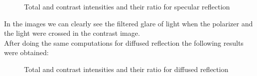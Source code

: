 \documentclass[english]{article}
\begin{document}
\begin{figure}[H]
	\centering
	\caption{Total and contrast intensities and their ratio for specular reflection}
	\label{fig:ten}
\end{figure}
In the images we can clearly see the filtered glare of light when the polarizer and the light were crossed in the contrast image.\\
After doing the same computations for diffused reflection the following results were obtained:
\begin{figure}[H]
	\centering
	\caption{Total and contrast intensities and their ratio for diffused reflection}
	\label{fig:eleven}
\end{figure}
\end{document}
